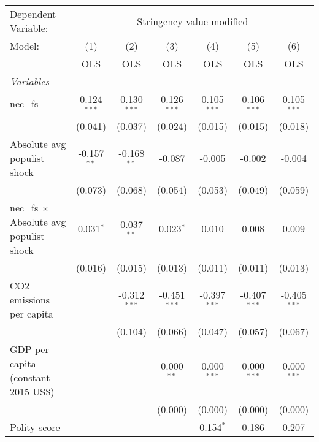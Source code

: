 
\begingroup
\centering
\begin{tabular}{lcccccc}
   \toprule
   Dependent Variable: & \multicolumn{6}{c}{Stringency value modified}\\
   Model:                                         & (1)           & (2)            & (3)            & (4)            & (5)            & (6)\\  
                                                  &  OLS          & OLS            & OLS            & OLS            & OLS            & OLS\\  
   \midrule
   \emph{Variables}\\
   nec\_fs                                        & 0.124$^{***}$ & 0.130$^{***}$  & 0.126$^{***}$  & 0.105$^{***}$  & 0.106$^{***}$  & 0.105$^{***}$\\   
                                                  & (0.041)       & (0.037)        & (0.024)        & (0.015)        & (0.015)        & (0.018)\\   
   Absolute avg populist shock                    & -0.157$^{**}$ & -0.168$^{**}$  & -0.087         & -0.005         & -0.002         & -0.004\\   
                                                  & (0.073)       & (0.068)        & (0.054)        & (0.053)        & (0.049)        & (0.059)\\   
   nec\_fs $\times$ Absolute avg populist shock   & 0.031$^{*}$   & 0.037$^{**}$   & 0.023$^{*}$    & 0.010          & 0.008          & 0.009\\   
                                                  & (0.016)       & (0.015)        & (0.013)        & (0.011)        & (0.011)        & (0.013)\\   
   CO2 emissions per capita                       &               & -0.312$^{***}$ & -0.451$^{***}$ & -0.397$^{***}$ & -0.407$^{***}$ & -0.405$^{***}$\\   
                                                  &               & (0.104)        & (0.066)        & (0.047)        & (0.057)        & (0.067)\\   
   GDP per capita (constant 2015 US\$)            &               &                & 0.000$^{**}$   & 0.000$^{***}$  & 0.000$^{***}$  & 0.000$^{***}$\\   
                                                  &               &                & (0.000)        & (0.000)        & (0.000)        & (0.000)\\   
   Polity score                                   &               &                &                & 0.154$^{*}$    & 0.186          & 0.207\\   

\end{tabular}
